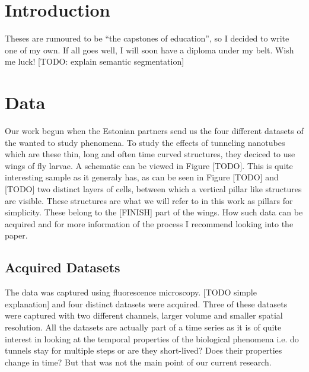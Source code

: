 \documentclass[
  digital,     %
  oneside,     %
  nosansbold,  %
  nocolorbold, %
  lof,         %
  lot,         %
]{fithesis4}
\begin{document}
\chapter*{Introduction}

Theses are rumoured to be \enquote{the capstones of education}, so
I decided to write one of my own. If all goes well, I will soon
have a diploma under my belt. Wish me luck!
[TODO: explain semantic segmentation] 

\chapter{Data}
    Our work begun when the Estonian partners send us the four different datasets of
the wanted to study phenomena. To study the effects of tunneling nanotubes which
are these thin, long and often time curved structures, they deciced to use wings
of fly larvae. A schematic can be viewed in Figure [TODO]. This is quite
interesting sample as it generaly has, as can be seen in Figure [TODO] and
[TODO] two distinct layers of cells, between which a vertical pillar like
structures are visible. These structures are what we will refer to in this work
as pillars for simplicity. These belong to the [FINISH] part of the wings. How
such data can be acquired and for more information of the process I recommend
looking into the \parencite{Tran2024Programmed} paper.

\section{Acquired Datasets}

The data was captured using fluorescence microscopy. [TODO simple explanation]
and four distinct datasets were acquired. Three of these datasets were captured
with two different channels, larger volume and smaller spatial resolution. All
the datasets are actually part of a time series as it is of quite interest in
looking at the temporal properties of the biological phenomena i.e. do tunnels
stay for multiple steps or are they short-lived? Does their properties change in
time? But that was not the main point of our current research.
\end{document}
